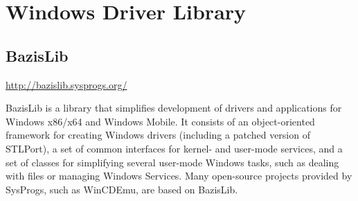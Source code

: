 \chapter{Windows Driver Library}


\section{BazisLib}
\label{sec:BazisLib}


\url{http://bazislib.sysprogs.org/}

BazisLib is a library that simplifies development of drivers and applications
for Windows x86/x64 and Windows Mobile. It consists of an object-oriented
framework for creating Windows drivers (including a patched version of STLPort),
a set of common interfaces for kernel- and user-mode services, and a set of
classes for simplifying several user-mode Windows tasks, such as dealing with
files or managing Windows Services. Many open-source projects provided by
SysProgs, such as WinCDEmu, are based on BazisLib.


